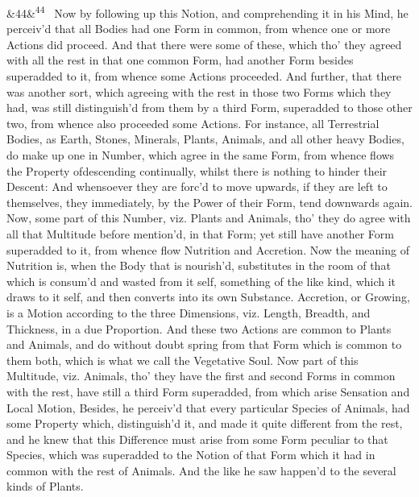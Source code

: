 \documentclass[12pt]{article}
\newcommand{\para}[1][]{\par\noindent\ifx&#1&\else\textsuperscript{\footnotesize #1}~\fi}
\begin{document}
\para[44] Now by following up this Notion, and comprehending it in his Mind, he perceiv'd that all Bodies had one Form in common, from whence one or more Actions did proceed. And that there were some of these, which tho' they agreed with all the rest in that one common Form, had another Form besides superadded to it, from whence some Actions proceeded. And further, that there was another sort, which agreeing with the rest in those two Forms which they had, was still distinguish'd from them by a third Form, superadded to those other two, from whence also proceeded some Actions. For instance, all Terrestrial Bodies, as Earth, Stones, Minerals, Plants, Animals, and all other heavy Bodies, do make up one in Number, which agree in the same Form, from whence flows the Property ofdescending continually, whilst there is nothing to hinder their Descent: And whensoever they are forc'd to move upwards, if they are left to themselves, they immediately, by the Power of their Form, tend downwards again. Now, some part of this Number, viz. Plants and Animals, tho' they do agree with all that Multitude before mention'd, in that Form; yet still have another Form superadded to it, from whence flow Nutrition and Accretion. Now the meaning of Nutrition is, when the Body that is nourish'd, substitutes in the room of that which is consum'd and wasted from it self, something of the like kind, which it draws to it self, and then converts into its own Substance. Accretion, or Growing, is a Motion according to the three Dimensions, viz. Length, Breadth, and Thickness, in a due Proportion. And these two Actions are common to Plants and Animals, and do without doubt spring from that Form which is common to them both, which is what we call the Vegetative Soul. Now part of this Multitude, viz. Animals, tho' they have the first and second Forms in common with the rest, have still a third Form superadded, from which arise Sensation and Local Motion, Besides, he perceiv'd that every particular Species of Animals, had some Property which, distinguish'd it, and made it quite different from the rest, and he knew that this Difference must arise from some Form peculiar to that Species, which was superadded to the Notion of that Form which it had in common with the rest of Animals. And the like he saw happen'd to the several kinds of Plants.
\end{document}
